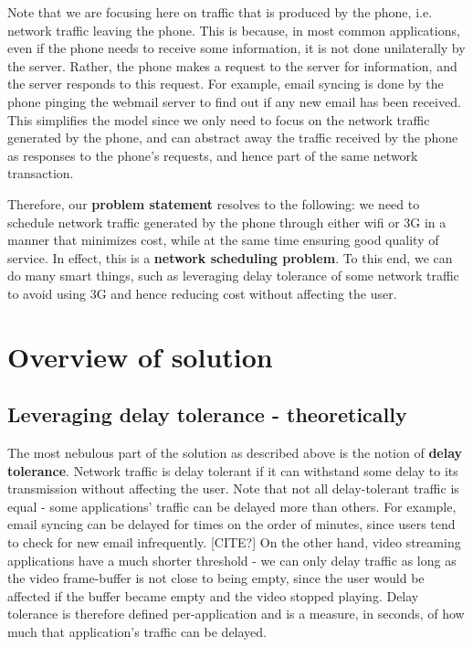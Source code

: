 \documentclass[12pt, fleqn]{article}
\begin{document}
Note that we are focusing here on traffic that is produced by the phone, i.e. 
network traffic leaving the phone. This is because, in most common applications, 
even if the phone needs to receive some information, it is not done unilaterally 
by the server. Rather, the phone makes a request to the server for information, 
and the server responds to this request. For example, email syncing is done by 
the phone pinging the webmail server to find out if any new email has been 
received. This simplifies the model since we only need to focus on the network
traffic generated by the phone, and can abstract away the traffic received by 
the phone as responses to the phone's requests, and hence part of the same 
network transaction.

Therefore, our \textbf{problem statement} resolves to the following: we need to 
schedule network traffic generated by the phone through either wifi or 3G in a 
manner that minimizes cost, while at the same time ensuring good quality of 
service. In effect, this is a \textbf{network scheduling problem}. 
To this end, we can do many smart things, such as leveraging delay 
tolerance of some network traffic to avoid using 3G and hence reducing cost 
without affecting the user.
 

\section{Overview of solution}
\label{overview}

\subsection{Leveraging delay tolerance - theoretically}

The most nebulous part of the solution as described above is the notion of 
\textbf{delay tolerance}. Network traffic is delay tolerant if it can withstand some 
delay to its transmission without affecting the user. Note that not all 
delay-tolerant traffic is equal - some applications' traffic can be delayed more than others. 
For example, email syncing can be delayed for times on the order of minutes, since users 
tend to check for new email infrequently. [CITE?] On the other hand, 
video streaming applications have a much shorter threshold - we can only delay 
traffic as long as the video frame-buffer is not close to being empty, since 
the user would be affected if the buffer became empty and the video stopped 
playing. Delay tolerance is therefore defined per-application and is a 
measure, in seconds, of how much that application's traffic can be delayed. 
\end{document}
